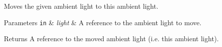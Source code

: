 Moves the given ambient light to this ambient light.


\begin{DoxyParams}[1]{Parameters}
\mbox{\tt in}  & {\em light} & A reference to the ambient light to move. \\
\hline
\end{DoxyParams}
\begin{DoxyReturn}{Returns}
A reference to the moved ambient light (i.\+e. this ambient light). 
\end{DoxyReturn}
